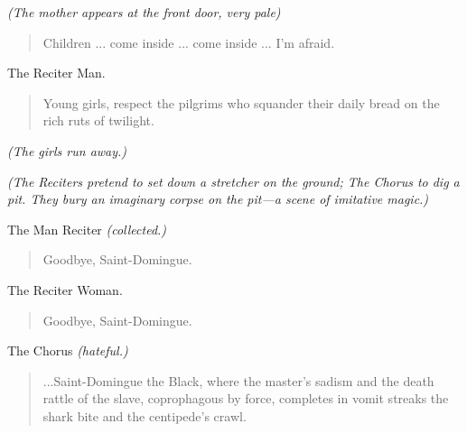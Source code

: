 \documentclass[letterpaper,article,12pt,oneside,notitlepage]{memoir}
\begin{document}
\textit{(The mother appears at the front door, very pale)}

\begin{verse}
\indent Children ... come inside ... come inside ... I'm afraid. \\
\end{verse}

\begin{center}The Reciter Man.\end{center}

\begin{verse}
\indent Young girls, respect the pilgrims who squander their daily bread on the rich ruts of twilight. \\
\end{verse}

\textit{(The girls run away.)}

\vspace{\baselineskip}

\textit{(The Reciters pretend to set down a stretcher on the ground; The Chorus to dig a pit. They bury an imaginary corpse on the pit—a scene of imitative magic.)}

\clearpage

\begin{center}The Man Reciter \textit{(collected.)}\end{center}

\begin{verse}
\hspace{1cm} Goodbye, Saint-Domingue. \\
\end{verse}

\begin{center}The Reciter Woman.\end{center}

\begin{verse}
\hspace{1cm} Goodbye, Saint-Domingue. \\
\end{verse}

\begin{center}The Chorus \textit{(hateful.)}\end{center}

\begin{verse}
\indent ...Saint-Domingue the Black, where the master's sadism and the death rattle of the slave, coprophagous by force, completes in vomit streaks the shark bite and the centipede's crawl. \\
\end{verse}
\end{document}
